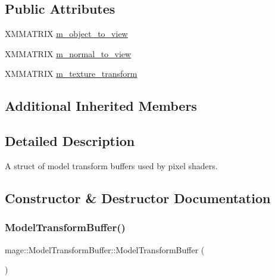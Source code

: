\subsection*{Public Attributes}
\begin{DoxyCompactItemize}
\item 
X\+M\+M\+A\+T\+R\+IX \hyperlink{structmage_1_1_model_transform_buffer_a637f19de6899ae97fa02e94bb6d52ba6}{m\+\_\+object\+\_\+to\+\_\+view}
\item 
X\+M\+M\+A\+T\+R\+IX \hyperlink{structmage_1_1_model_transform_buffer_a0c51da0491448a7c21da6fce7b77f89f}{m\+\_\+normal\+\_\+to\+\_\+view}
\item 
X\+M\+M\+A\+T\+R\+IX \hyperlink{structmage_1_1_model_transform_buffer_a06ad76c28119e4da55f8bd863715c042}{m\+\_\+texture\+\_\+transform}
\end{DoxyCompactItemize}
\subsection*{Additional Inherited Members}


\subsection{Detailed Description}
A struct of model transform buffers used by pixel shaders. 

\subsection{Constructor \& Destructor Documentation}
\hypertarget{structmage_1_1_model_transform_buffer_a6c137b9d041ea196f656953002d19d54}{}\label{structmage_1_1_model_transform_buffer_a6c137b9d041ea196f656953002d19d54} 
\subsubsection{\texorpdfstring{Model\+Transform\+Buffer()}{ModelTransformBuffer()}\hspace{0.1cm}{\footnotesize\ttfamily [1/3]}}
{\footnotesize\ttfamily mage\+::\+Model\+Transform\+Buffer\+::\+Model\+Transform\+Buffer (\begin{DoxyParamCaption}{ }\end{DoxyParamCaption})}

